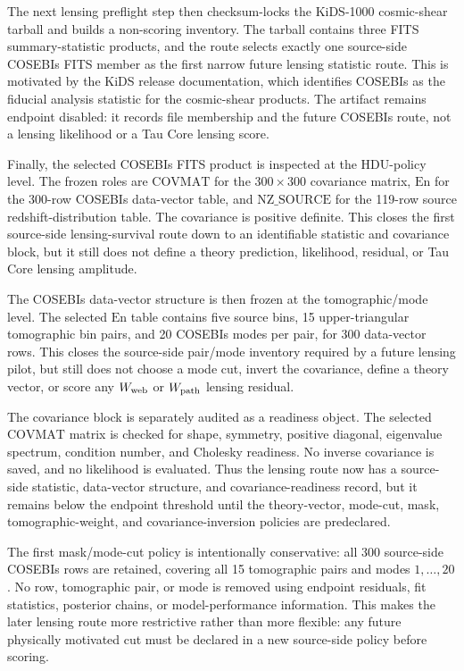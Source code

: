 \documentclass[11pt]{article}
\begin{document}
The next lensing preflight step then checksum-locks the KiDS-1000 cosmic-shear
tarball and builds a non-scoring inventory. The tarball contains three FITS
summary-statistic products, and the route selects exactly one source-side
COSEBIs FITS member as the first narrow future lensing statistic route. This is
motivated by the KiDS release documentation, which identifies COSEBIs as the
fiducial analysis statistic for the cosmic-shear products. The artifact remains
endpoint disabled: it records file membership and the future COSEBIs route, not
a lensing likelihood or a Tau Core lensing score.

Finally, the selected COSEBIs FITS product is inspected at the HDU-policy level.
The frozen roles are \( \mathrm{COVMAT} \) for the \(300\times300\) covariance
matrix, \(\mathrm{En}\) for the 300-row COSEBIs data-vector table, and
\(\mathrm{NZ\_SOURCE}\) for the 119-row source redshift-distribution table.
The covariance is positive definite. This closes the first source-side
lensing-survival route down to an identifiable statistic and covariance block,
but it still does not define a theory prediction, likelihood, residual, or Tau
Core lensing amplitude.

The COSEBIs data-vector structure is then frozen at the tomographic/mode level.
The selected \(\mathrm{En}\) table contains five source bins, 15
upper-triangular tomographic bin pairs, and 20 COSEBIs modes per pair, for 300
data-vector rows. This closes the source-side pair/mode inventory required by a
future lensing pilot, but still does not choose a mode cut, invert the
covariance, define a theory vector, or score any \(W_{\rm web}\) or
\(W_{\rm path}\) lensing residual.

The covariance block is separately audited as a readiness object. The selected
\(\mathrm{COVMAT}\) matrix is checked for shape, symmetry, positive diagonal,
eigenvalue spectrum, condition number, and Cholesky readiness. No inverse
covariance is saved, and no likelihood is evaluated. Thus the lensing route now
has a source-side statistic, data-vector structure, and covariance-readiness
record, but it remains below the endpoint threshold until the theory-vector,
mode-cut, mask, tomographic-weight, and covariance-inversion policies are
predeclared.

The first mask/mode-cut policy is intentionally conservative: all 300
source-side COSEBIs rows are retained, covering all 15 tomographic pairs and
modes \(1,\ldots,20\). No row, tomographic pair, or mode is removed using
endpoint residuals, fit statistics, posterior chains, or model-performance
information. This makes the later lensing route more restrictive rather than
more flexible: any future physically motivated cut must be declared in a new
source-side policy before scoring.
\end{document}
